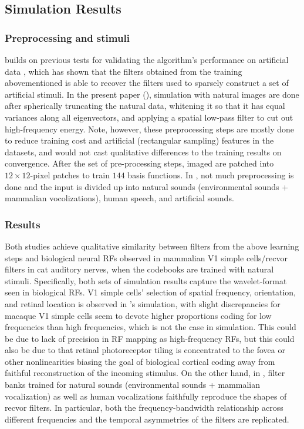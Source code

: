 \documentclass[
	a4paper, %
	11pt, %
	unnumberedsections, %
]{LTJournalArticle}
\begin{document}
\subsection{Simulation Results}%
  \label{sub:Simulation Results}
\subsubsection{Preprocessing and stimuli}%
  \label{sub:Preprocessing and stimuli}
\textcite{olshausenSparseCodingOvercomplete1997} builds on previous tests for validating the algorithm's performance on artificial data \cite{Olshausen1996}, which has shown that the filters obtained from the training abovementioned is able to recover the filters used to sparsely construct a set of artificial stimuli. In the present paper (\cite{olshausenSparseCodingOvercomplete1997}), simulation with natural images are done after spherically truncating the natural data, whitening it so that it has equal variances along all eigenvectors, and applying a spatial low-pass filter to cut out high-frequency energy. Note, however, these preprocessing steps are mostly done to reduce training cost and artificial (rectangular sampling) features in the datasets, and would not cast qualitative differences to the training results on convergence. After the set of pre-processing steps, imaged are patched into $12 \times 12$-pixel patches to train $144$ basis functions. In \textcite{smithEfficientAuditoryCoding2006}, not much preprocessing is done and the input is divided up into natural sounds (environmental sounds + mammalian vocolizations), human speech, and artificial sounds. 
\subsubsection{Results}%
  \label{sub:Results}
Both studies achieve qualitative similarity between filters from the above learning steps and biological neural RFs observed in mammalian V1 simple cells/recvor filters in cat auditory nerves, when the codebooks are trained with natural stimuli. Specifically, both sets of simulation results capture the wavelet-format seen in biological RFs. V1 simple cells' selection of spatial frequency, orientation, and retinal location is observed in \textcite{olshausenSparseCodingOvercomplete1997}'s simulation, with slight discrepancies for macaque V1 simple cells seem to devote higher proportions coding for low frequencies than high frequencies, which is not the case in simulation. This could be due to lack of precision in RF mapping as high-frequency RFs, but this could also be due to that retinal photoreceptor tiling is concentrated to the fovea or other nonlinearities biasing the goal of biological cortical coding away from faithful reconstruction of the incoming stimulus. On the other hand, in \textcite{smithEfficientAuditoryCoding2006}, filter banks trained for natural sounds (environmental sounds + mammalian vocalization) as well as human vocalizations faithfully reproduce the shapes of recvor filters. In particular, both the frequency-bandwidth relationship across different frequencies and the temporal asymmetries of the filters are replicated. 
\end{document}
